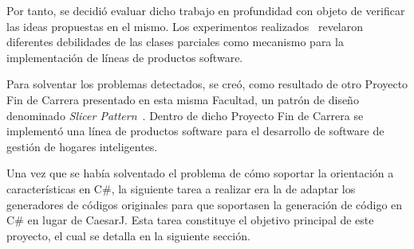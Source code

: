 Por tanto, se decidió evaluar dicho trabajo en profundidad con objeto de verificar las ideas propuestas en el mismo. Los experimentos realizados~\citep{sanchez:2010} revelaron diferentes debilidades de las clases parciales como mecanismo para la implementación de líneas de productos software.

Para solventar los problemas detectados, se creó, como resultado de otro Proyecto Fin de Carrera presentado en esta misma Facultad, un patrón de diseño denominado \emph{Slicer Pattern}~\citep{perez:2011}. Dentro de dicho Proyecto Fin de Carrera se implementó una línea de productos software para el desarrollo de software de gestión de hogares inteligentes.

Una vez que se había solventado el problema de cómo soportar la orientación a características en C\#, la siguiente tarea a realizar era la de adaptar los generadores de códigos originales para que soportasen la generación de código en C\# en lugar de CaesarJ. Esta tarea constituye el objetivo principal de este proyecto, el cual se detalla en la siguiente sección.


